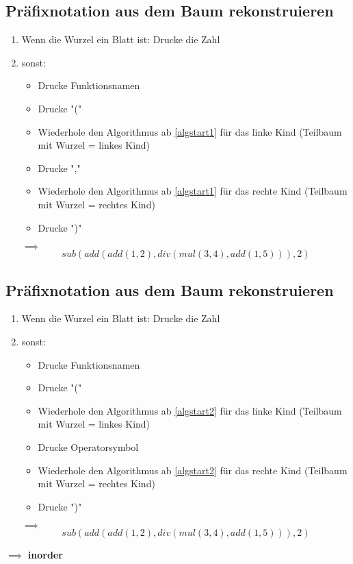 \documentclass[a4paper]{scrartcl}
\theoremstyle{definition}
\theoremstyle{plain}
\theoremstyle{remark}
\theoremstyle{remark}
\begin{document}
\subsection{Präfixnotation aus dem Baum rekonstruieren}
\label{sec-4-4}
\begin{enumerate}
\item \label{algstart1} Wenn die Wurzel ein Blatt ist: Drucke die Zahl
\item sonst:
\begin{itemize}
\item Drucke Funktionsnamen
\item Drucke "("
\item Wiederhole den Algorithmus ab \ref{algstart1} für das linke Kind (Teilbaum mit Wurzel = linkes Kind)
\item Drucke ","
\item Wiederhole den Algorithmus ab \ref{algstart1} für das rechte Kind (Teilbaum mit Wurzel = rechtes Kind)
\item Drucke ")"
\end{itemize}
$\implies$ \[sub(add(add(1,2),div(mul(3,4),add(1,5))), 2)\]
\end{enumerate}
\subsection{Präfixnotation aus dem Baum rekonstruieren}
\label{sec-4-5}
\begin{enumerate}
\item \label{algstart2} Wenn die Wurzel ein Blatt ist: Drucke die Zahl
\item sonst:
\begin{itemize}
\item Drucke Funktionsnamen
\item Drucke "("
\item Wiederhole den Algorithmus ab \ref{algstart2} für das linke Kind (Teilbaum mit Wurzel = linkes Kind)
\item Drucke Operatorsymbol
\item Wiederhole den Algorithmus ab \ref{algstart2} für das rechte Kind (Teilbaum mit Wurzel = rechtes Kind)
\item Drucke ")"
\end{itemize}
$\implies$ \[sub(add(add(1,2),div(mul(3,4),add(1,5))), 2)\]
\end{enumerate}
$\implies$ \textbf{inorder}
\end{document}
